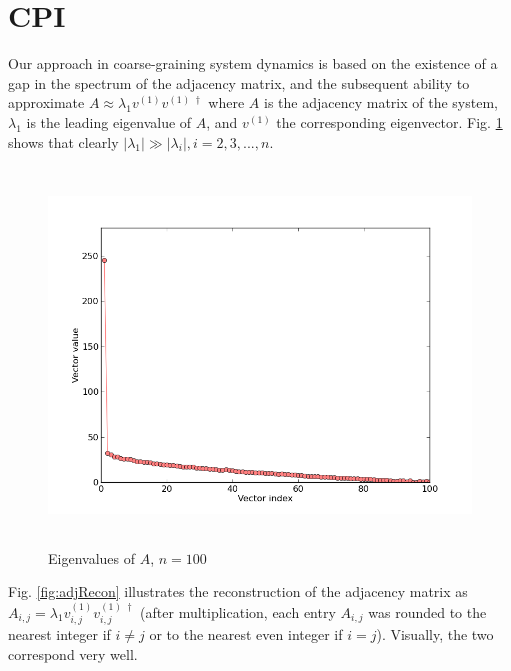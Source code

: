 \documentclass[11pt]{article}
\begin{document}
\clearpage
\section*{CPI}
Our approach in coarse-graining system dynamics is based on the existence of a gap in the spectrum of the adjacency matrix, and the subsequent ability to approximate $A\approx \lambda_{1}v^{(1)}v^{(1) \;\dagger}$ where $A$ is the adjacency matrix of the system, $\lambda_{1}$ is the leading eigenvalue of $A$, and $v^{(1)}$ the corresponding eigenvector. Fig. \ref{fig:spectralGap} shows that clearly $|\lambda_{1}| \gg |\lambda_{i}|, i=2,3,...,n$. 

\begin{figure}[h]
  \centering
  \includegraphics[height=10cm]{spectralGap100}
  \caption{Eigenvalues of $A$, $n=100$}
  \label{fig:spectralGap}
\end{figure}

Fig. \ref{fig:adjRecon} illustrates the reconstruction of the adjacency matrix as $A_{i,j}=\lambda_{1}v^{(1)}_{i,j}v^{(1) \;\dagger}_{i,j}$ (after multiplication, each entry $A_{i,j}$ was rounded to the nearest integer if $i\neq j$ or to the nearest even integer if $i=j$). Visually, the two correspond very well.
\end{document}
